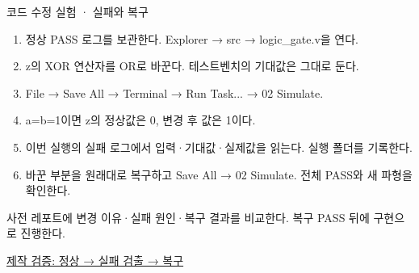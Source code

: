 \begin{frame}{코드 수정 실험 · 실패와 복구}\relax
\small
\begin{enumerate}\setlength{\itemsep}{0.22cm}
\item 정상 PASS 로그를 보관한다. Explorer → src → logic\_gate.v을 연다.
\item z의 XOR 연산자를 OR로 바꾼다. 테스트벤치의 기대값은 그대로 둔다.
\item File → Save All → Terminal → Run Task... → 02 Simulate.
\item a=b=1이면 z의 정상값은 0, 변경 후 값은 1이다.
\item 이번 실행의 실패 로그에서 입력·기대값·실제값을 읽는다. 실행 폴더를 기록한다.
\item 바꾼 부분을 원래대로 복구하고 Save All → 02 Simulate. 전체 PASS와 새 파형을 확인한다.
\end{enumerate}
사전 레포트에 변경 이유·실패 원인·복구 결과를 비교한다. 복구 PASS 뒤에 구현으로 진행한다.\par\href{https://github.com/Glaysia/ece2_26_2_2/blob/daily/0910/example/fpga_projects_hdl/LAB1/docs/student-modification-validation.json}{제작 검증: 정상 → 실패 검출 → 복구}
\end{frame}

